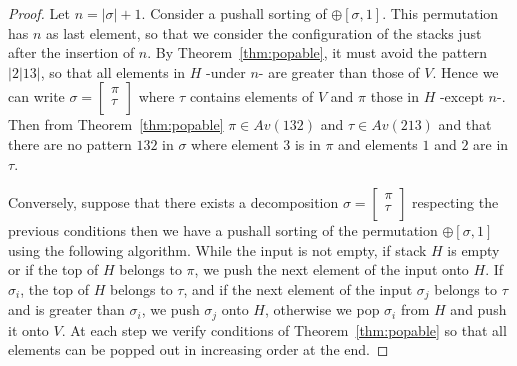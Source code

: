 \documentclass[11pt]{article}
\newcommand{\patternVH}{\ensuremath{|2|13|}\xspace}
\begin{document}
\begin{proof}
Let $n = |\sigma|+1$. 
Consider a pushall sorting of $\oplus[\sigma,1]$. 
This permutation has $n$ as last element, so that we consider the configuration of the stacks just after the insertion of $n$. 
By Theorem~\ref{thm:popable}, it must avoid the pattern \patternVH, so that all elements in $H$ -under $n$- are greater than those of $V$.
Hence we can write $\sigma = \left[
\begin{array}{l}
\pi \\
\tau \\
\end{array}
\right] $ where $\tau$ contains elements of $V$ and $\pi$ those in $H$ -except $n$-.
Then from Theorem~\ref{thm:popable} $\pi \in Av(132)$ and $\tau \in Av(213)$ and that there are no pattern $132$ in $\sigma$ where element $3$ is in $\pi$ and elements $1$ and $2$ are in $\tau$.

Conversely, suppose that there exists a decomposition $\sigma = \left[
\begin{array}{l}
\pi \\
\tau \\
\end{array}
\right] $ respecting the previous conditions then we have a pushall sorting of the permutation $\oplus[\sigma,1]$ using the following algorithm.
While the input is not empty, if stack $H$ is empty or if the top of $H$ belongs to $\pi$, we push the next element of the input onto $H$. 
If $\sigma_i$, the top of $H$ belongs to $\tau$, and if the next element of the input $\sigma_j$ belongs to $\tau$ and is greater than $\sigma_i$, we push $\sigma_j$ onto $H$, otherwise we pop $\sigma_i$ from $H$ and push it onto $V$. 
At each step we verify conditions of Theorem~\ref{thm:popable} so that all elements can be popped out in increasing order at the end.
\end{proof}
\end{document}
